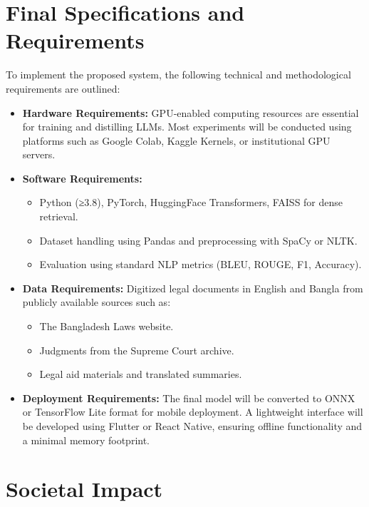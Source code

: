 \section{Final Specifications and Requirements}

To implement the proposed system, the following technical and methodological requirements are outlined:

\begin{itemize}
    \item \textbf{Hardware Requirements:} GPU-enabled computing resources are essential for training and distilling LLMs. Most experiments will be conducted using platforms such as Google Colab, Kaggle Kernels, or institutional GPU servers.
    
    \item \textbf{Software Requirements:}
    \begin{itemize}
        \item Python (≥3.8), PyTorch, HuggingFace Transformers, FAISS for dense retrieval.
        \item Dataset handling using Pandas and preprocessing with SpaCy or NLTK.
        \item Evaluation using standard NLP metrics (BLEU, ROUGE, F1, Accuracy).
    \end{itemize}

    \item \textbf{Data Requirements:} Digitized legal documents in English and Bangla from publicly available sources such as:
    \begin{itemize}
        \item The Bangladesh Laws website.
        \item Judgments from the Supreme Court archive.
        \item Legal aid materials and translated summaries.
    \end{itemize}

    \item \textbf{Deployment Requirements:} The final model will be converted to ONNX or TensorFlow Lite format for mobile deployment. A lightweight interface will be developed using Flutter or React Native, ensuring offline functionality and a minimal memory footprint.
\end{itemize}



\section{Societal Impact}


